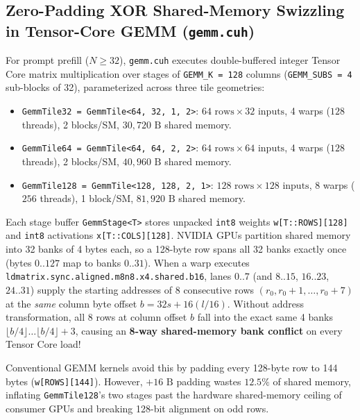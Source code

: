 \documentclass[10pt,a4paper]{article}
\theoremstyle{swzstyle}
\newcommand{\code}[1]{\texttt{#1}}
\begin{document}
\subsection{Zero-Padding XOR Shared-Memory Swizzling in Tensor-Core GEMM (\texttt{gemm.cuh})}

For prompt prefill ($N \ge 32$), \code{gemm.cuh} executes double-buffered integer Tensor Core matrix multiplication over stages of \code{GEMM\_K = 128} columns (\code{GEMM\_SUBS = 4} sub-blocks of 32), parameterized across three tile geometries:
\begin{itemize}
  \item \code{GemmTile32 = GemmTile<64, 32, 1, 2>}: $64\text{ rows} \times 32\text{ inputs}$, 4 warps ($128$ threads), 2 blocks/SM, $30,720\text{ B}$ shared memory.
  \item \code{GemmTile64 = GemmTile<64, 64, 2, 2>}: $64\text{ rows} \times 64\text{ inputs}$, 4 warps ($128$ threads), 2 blocks/SM, $40,960\text{ B}$ shared memory.
  \item \code{GemmTile128 = GemmTile<128, 128, 2, 1>}: $128\text{ rows} \times 128\text{ inputs}$, 8 warps ($256$ threads), 1 block/SM, $81,920\text{ B}$ shared memory.
\end{itemize}

Each stage buffer \code{GemmStage<T>} stores unpacked \code{int8} weights \code{w[T::ROWS][128]} and \code{int8} activations \code{x[T::COLS][128]}. NVIDIA GPUs partition shared memory into 32 banks of 4 bytes each, so a 128-byte row spans all 32 banks exactly once (bytes $0..127$ map to banks $0..31$). When a warp executes \code{ldmatrix.sync.aligned.m8n8.x4.shared.b16}, lanes $0..7$ (and $8..15$, $16..23$, $24..31$) supply the starting addresses of 8 consecutive rows $(r_0, r_0+1, \dots, r_0+7)$ at the \emph{same} column byte offset $b = 32s + 16(l/16)$. Without address transformation, all 8 rows at column offset $b$ fall into the exact same 4 banks $\lfloor b/4 \rfloor \dots \lfloor b/4 \rfloor + 3$, causing an \textbf{8-way shared-memory bank conflict} on every Tensor Core load!

Conventional GEMM kernels avoid this by padding every 128-byte row to 144 bytes (\code{w[ROWS][144]}). However, $+16\text{ B}$ padding wastes $12.5\%$ of shared memory, inflating \code{GemmTile128}'s two stages past the hardware shared-memory ceiling of consumer GPUs and breaking 128-bit alignment on odd rows.
\end{document}
